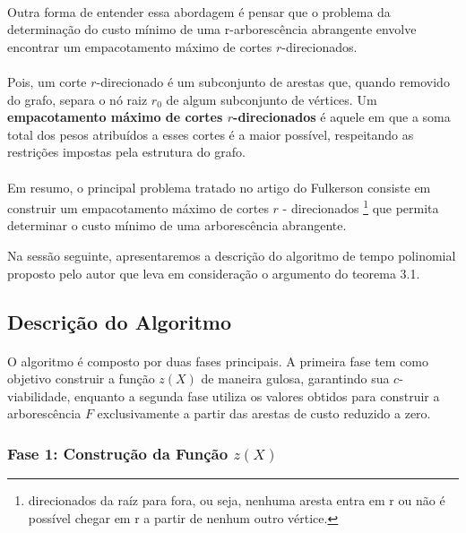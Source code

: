 \documentclass[12pt,a4paper]{article}
\begin{document}
\paragraph{}
Outra forma de entender essa abordagem é pensar que o problema da determinação do custo mínimo de uma r-arborescência abrangente envolve encontrar um empacotamento máximo de cortes \( r \)-direcionados.

\paragraph{}
Pois, um corte \( r \)-direcionado é um subconjunto de arestas que, quando removido do grafo, separa o nó raiz \( r_0 \) de algum subconjunto de vértices. Um \textbf{empacotamento máximo de cortes \( r \)-direcionados} é aquele em que a soma total dos pesos atribuídos a esses cortes é a maior possível, respeitando as restrições impostas pela estrutura do grafo.

\paragraph{}
Em resumo, o principal problema tratado no artigo do Fulkerson consiste em construir um empacotamento máximo de cortes \( r \) - direcionados \footnote{direcionados da raíz para fora, ou seja, nenhuma aresta entra em r ou não é possível chegar em r a partir de nenhum outro vértice.} que permita determinar o custo mínimo de uma arborescência abrangente. 

Na sessão seguinte, apresentaremos a descrição do algoritmo de tempo polinomial proposto pelo autor que leva em consideração o argumento do teorema 3.1.

\subsection{Descrição do Algoritmo}

\paragraph{}
O algoritmo é composto por duas fases principais. A primeira fase tem como objetivo construir a função \( z(X) \) de maneira gulosa, garantindo sua \( c \)-viabilidade, enquanto a segunda fase utiliza os valores obtidos para construir a arborescência \( F \) exclusivamente a partir das arestas de custo reduzido a zero.

\subsubsection{Fase 1: Construção da Função \texorpdfstring{$z(X)$}{z(X)}}
\end{document}
